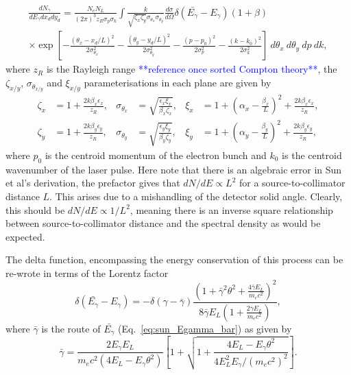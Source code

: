 \documentclass[../main.tex]{subfiles}
\begin{document}
\begin{multline}
\frac{dN_{\gamma}}{dE_{\gamma}dx_{d}dy_{d}} = \frac{N_{e}N_{L}}{\left(2\pi\right)^{3}z_{R}\sigma_{p}\sigma_{k}}\int \frac{k}{\sqrt{\zeta_{x}\zeta_{y}}\sigma_{\theta_{x}}\sigma_{\theta_{y}}}\frac{d\sigma}{d\Omega}\delta\left(\bar{E_{\gamma}}-E_{\gamma}\right)\left(1+\beta\right) \\\times\exp\left[-\frac{\left(\theta_{x}-x_{d}/L\right)^{2}}{2\sigma_{\theta_{x}}^{2}}-\frac{\left(\theta_{y}-y_{d}/L\right)^{2}}{2\sigma_{\theta_{y}}^{2}}-\frac{\left(p-p_{0}\right)^{2}}{2\sigma_{p}^{2}}-\frac{\left(k-k_{0}\right)^{2}}{2\sigma_{k}^{2}}\right]~d\theta_{x}~d\theta_{y}~dp~dk,
\label{eq:sun_volume_time_integral}    
\end{multline}
where $z_{R}$ is the Rayleigh range \textcolor{blue}{**reference once sorted Compton theory**}, the $\zeta_{x/y}$, $\sigma_{\theta_{x/y}}$ and  $\xi_{x/y}$ parameterisations in each plane are given by
\begin{align}
\zeta_{x} &= 1+\frac{2k\beta_{x}\epsilon_{x}}{z_{R}}, & \sigma_{\theta_{x}} &= \sqrt{\frac{\epsilon_{x}\xi_{x}}{\beta_{x}\zeta_{x}}}, & \xi_{x} &= 1+\left(\alpha_{x}-\frac{\beta_{x}}{L}\right)^{2}+\frac{2k\beta_{x}\epsilon_{x}}{z_{R}}, \nonumber\\
\zeta_{y} &= 1+\frac{2k\beta_{y}\epsilon_{y}}{z_{R}}, & \sigma_{\theta_{y}} &= \sqrt{\frac{\epsilon_{y}\xi_{y}}{\beta_{y}\zeta_{y}}}, & \xi_{y} &= 1+\left(\alpha_{y}-\frac{\beta_{y}}{L}\right)^{2}+\frac{2k\beta_{y}\epsilon_{y}}{z_{R}}, 
\label{eq:zeta_sigmatheta_xi_parameters_sun}
\end{align}
where $p_{0}$ is the centroid momentum of the electron bunch and $k_{0}$ is the centroid wavenumber of the laser pulse. Here note that there is an algebraic error in Sun et al's \cite{sun2009characterizations,sun2011theoretical} derivation, the prefactor gives that $dN/dE\propto L^{2}$ for a source-to-collimator distance $L$. This arises due to a mishandling of the detector solid angle. Clearly, this should be $dN/dE\propto 1/L^{2}$, meaning there is an inverse square relationship between source-to-collimator distance and the spectral density as would be expected. 

The delta function, encompassing the energy conservation of this process can be re-wrote in terms of the Lorentz factor
\begin{equation}
\delta\left(\bar{E_{\gamma}}-E_{\gamma}\right) = -\delta\left(\gamma-\bar{\gamma}\right)\frac{\left(1+\bar{\gamma}^{2}\theta^{2}+\frac{4\bar{\gamma}E_{L}}{m_{e}c^{2}}\right)^{2}}{8\bar{\gamma}E_{L}\left(1+\frac{2\bar{\gamma}E_{L}}{m_{e}c^{2}}\right)},
\label{eq:sun_electron_energy_delta_function}    
\end{equation}
where $\bar{\gamma}$ is the route of $\bar{E_{\gamma}}$ (Eq.~\ref{eq:sun_Egamma_bar}) as given by
\begin{equation}
\bar{\gamma} = \frac{2E_{\gamma}E_{L}}{m_{e}c^{2}\left(4E_{L}-E_{\gamma}\theta^{2}\right)}\left[1+\sqrt{1+\frac{4E_{L}-E_{\gamma}\theta^{2}}{4E_{L}^{2}E_{\gamma}/\left(m_{e}c^{2}\right)^{2}}}\right].    
\end{equation}
\end{document}
